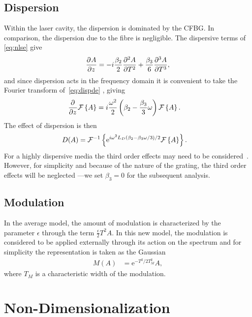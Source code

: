 \subsection{Dispersion}
Within the laser cavity, the dispersion is dominated by the CFBG. In comparison, the dispersion due to the fibre is negligible. The dispersive terms of \eqref{eq:nlse} give
\begin{align}
\label{eq:dispde}
	\pdiff{A}{z} = -i \frac{\beta_2}{2} \pdiff[2]{A}{T} + \frac{\beta_3}{6} \pdiff[3]{A}{T},
\end{align}
and since dispersion acts in the frequency domain it is convenient to take the Fourier transform of~\eqref{eq:dispde} \cite{gradshteyn}, giving
\begin{align*}
	\frac{\partial^{}}{\partial{z}^{}}\mathcal{F}\left\{ A \right\} &= i\frac{\omega^2}{2}\left(\beta_2 - \frac{\beta_3}{3} \omega\right) \mathcal{F}\left\{ A \right\}.
\end{align*}
The effect of dispersion is then
\begin{align*}
D(A) &= \mathcal{F}^{-1}\left\{ \textrm{e}^{i \omega^2 L_D(\beta_2 - \beta_3 \omega/3)/2} \mathcal{F}\left\{ A \right\} \right\}.
\end{align*}
For a highly dispersive media the third order effects may need to be considered~\cite{agrawal2013, litchinitser}. However, for simplicity and because of the nature of the grating, the third order effects will be neglected \cite{agrawal2013, ferreira}---we set $\beta_3=0$ for the subsequent analysis.

\subsection{Modulation}
In the average model, the amount of modulation is characterized by the parameter $\epsilon$ through the term $\frac{\epsilon}{2}T^2 A$. In this new model, the modulation is considered to be applied externally through its action on the spectrum and for simplicity the representation is taken as the Gaussian
\begin{align*}
M(A) &= \textrm{e}^{-T^2 / 2 T_M^2} A,
\end{align*}
where $T_M$ is a characteristic width of the modulation.

\section{Non-Dimensionalization}

